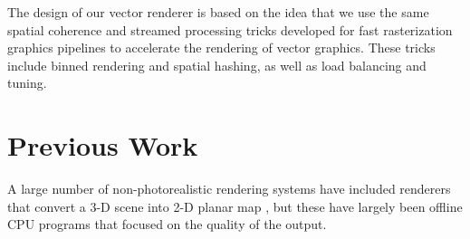 \documentclass[review]{acmsiggraph}
\begin{document}
The design of our vector renderer is based on the idea that we use the same
spatial coherence and streamed processing tricks developed for fast
rasterization graphics pipelines to accelerate the rendering of vector
graphics. These tricks include binned rendering and spatial hashing, as well
as load balancing and tuning.


\section{Previous Work}
A large number of non-photorealistic rendering systems have included renderers
that convert a 3-D scene into 2-D planar map
\cite{winkenbach94,hertzmann2000,stroila2008,eisemann2008,eisemann2009,karsch2011},
but these have largely
been offline CPU programs that focused on the quality of the output.



\end{document}
